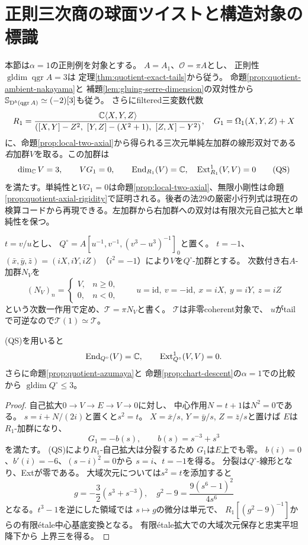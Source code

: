 \section{正則三次商の球面ツイストと構造対象の標識}
\label{sec:quotient-spherical-twist}
本節は$\alpha=1$の正則例を対象とする。
$A=A_1$、$\mathcal O=\pi A$とし、
正則性$\operatorname{gldim}\operatorname{qgr}A=3$は
定理\ref{thm:quotient-exact-tails}から従う。
命題\ref{prop:quotient-ambient-nakayama}と
補題\ref{lem:gluing-serre-dimension}の双対性から
$\mathbb S_{\mathrm D^b(\operatorname{qgr}A)}\simeq(-2)[3]$も従う。
さらにfiltered三変数代数
\[
 R_1=
 \frac{\mathbb C\langle X,Y,Z\rangle}
 {([X,Y]-Z^2,\ [Y,Z]-(X^2+1),\ [Z,X]-Y^2)},
 \quad G_1=\Omega_1(X,Y,Z)+X
\]
に、命題\ref{prop:local-two-axial}から得られる三次元単純左加群の線形双対である\emph{右}加群$V$を取る。この加群は
\[
 \dim_\mathbb C V=3,\qquad VG_1=0,\qquad
 \operatorname{End}_{R_1}(V)=\mathbb C,\quad
 \operatorname{Ext}^1_{R_1}(V,V)=0
\tag{QS}
\]
を満たす。単純性と$VG_1=0$は命題\ref{prop:local-two-axial}、無限小剛性は命題\ref{prop:quotient-axial-rigidity}で証明される。後者の法$29$の厳密小行列式は現在の検算コードから再現できる。左加群から右加群への双対は有限次元自己拡大と単純性を保つ。

$t=v/u$とし、
$Q^\circ=A[u^{-1},v^{-1},(v^3-u^3)^{-1}]_0$と置く。
$t=-1$、$(\bar x,\bar y,\bar z)=(iX,iY,iZ)$
（$i^2=-1$）により$V$を$Q^\circ$-加群とする。
次数付き右$A$-加群$N_V$を
\[
 (N_V)_n=
 \begin{cases}V,&n\ge0,\\0,&n<0,\end{cases}
 \qquad u=\mathrm{id},\ v=-\mathrm{id},\
 x=iX,\ y=iY,\ z=iZ
\]
という次数一作用で定め、$\mathcal T=\pi N_V$と書く。
$\mathcal T$は非零coherent対象で、
$u$がtailで可逆なので$\mathcal T(1)\simeq\mathcal T$。

\begin{lemma}[局所自己拡大の消滅]
\label{lem:quotient-rigid-chart}
(QS)を用いると
\[
 \operatorname{End}_{Q^\circ}(V)=\mathbb C,\qquad
 \operatorname{Ext}^1_{Q^\circ}(V,V)=0 .
\]
さらに命題\ref{prop:quotient-azumaya}と
命題\ref{prop:chart-descent}の$\alpha=1$での比較から
$\operatorname{gldim}Q^\circ\le3$。
\end{lemma}
\begin{proof}
自己拡大$0\to V\to E\to V\to0$に対し、
中心作用$N=t+1$は$N^2=0$である。
$s=i+N/(2i)$と置くと$s^2=t$。
$X=\bar x/s$, $Y=\bar y/s$, $Z=\bar z/s$と置けば
$E$は$R_1$-加群になり、
\[
 G_1=-b(s),\qquad b(s)=s^{-3}+s^3
\]
を満たす。
(QS)により$R_1$-自己拡大は分裂するため
$G_1$は$E$上でも零。
$b(i)=0$、$b'(i)=-6$、$(s-i)^2=0$から
$s=i$、$t=-1$を得る。
分裂は$Q^\circ$-線形となり、Extが零である。
大域次元については$s^2=t$を添加すると
\[
 g=-\frac32(s^3+s^{-3}),\quad
 g^2-9=\frac{9(s^6-1)^2}{4s^6}
\]
となる。$t^3-1$を逆にした領域では
$s\mapsto g$の微分は単元で、
$R_1[(g^2-9)^{-1}]$からの有限\'etale中心基底変換となる。
有限\'etale拡大での大域次元保存と忠実平坦降下から
上界三を得る。
\end{proof}

